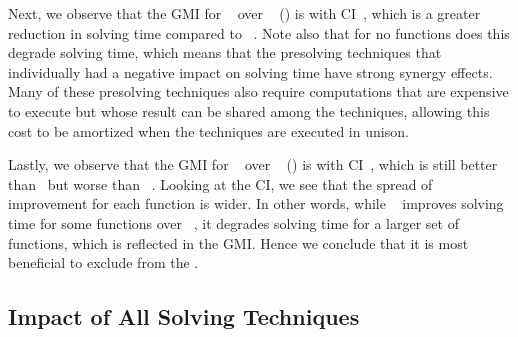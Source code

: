 Next, we observe that the \gls{GMI} for ~\modelE{}
over ~\modelC{}
() is \printGMI{%
  \SolvTechDisableBadPresolvingPrePlusSolvingTimeSpeedupPrePlusSolvingTimeRegularSpeedupGmean%
} with \gls{CI}~\printGMICI{%
  \SolvTechDisableBadPresolvingPrePlusSolvingTimeSpeedupPrePlusSolvingTimeRegularSpeedupCiMin%
}{%
  \SolvTechDisableBadPresolvingPrePlusSolvingTimeSpeedupPrePlusSolvingTimeRegularSpeedupCiMax%
}, which is a greater reduction in solving time compared to ~\modelD.
%
Note also that for no \glspl{function} does this 
degrade solving time, which means that the \gls{presolving} techniques that
individually had a negative impact on solving time have strong synergy effects.
%
Many of these \gls{presolving} techniques also require computations that are
expensive to execute but whose result can be shared among the techniques,
allowing this cost to be amortized when the techniques are executed in unison.

Lastly, we observe that the \gls{GMI} for ~\modelF{}
over ~\modelC{}
() is \printGMI{%
  \SolvTechDisableAllPresolvingPrePlusSolvingTimeSpeedupPrePlusSolvingTimeRegularSpeedupGmean%
} with \gls{CI}~\printGMICI{%
  \SolvTechDisableAllPresolvingPrePlusSolvingTimeSpeedupPrePlusSolvingTimeRegularSpeedupCiMin%
}{%
  \SolvTechDisableAllPresolvingPrePlusSolvingTimeSpeedupPrePlusSolvingTimeRegularSpeedupCiMax%
}, which is still better than ~\modelD but worse than
~\modelE.
%
Looking at the \gls{CI}, we see that the spread of improvement for each
\gls{function} is wider.
%
In other words, while ~\modelF{} improves solving
time for some \glspl{function} over ~\modelE, it
degrades solving time for a larger set of \glspl{function}, which is reflected
in the \gls{GMI}.
%
Hence we conclude that it is most beneficial to exclude
 from the
.


\subsection{Impact of All Solving Techniques}

\def\modelA{\textsc{i}}
\def\modelB{\textsc{ii}}
\def\modelC{\textsc{iii}}
\def\modelD{\textsc{iv}}
\def\modelE{\textsc{v}}

